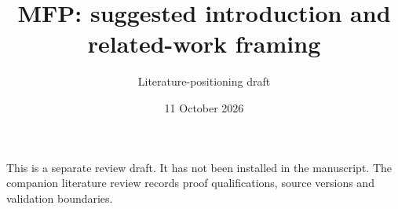 \documentclass[11pt]{article}
\title{MFP: suggested introduction and related-work framing}
\author{Literature-positioning draft}
\date{11 October 2026}
\begin{document}
\maketitle
\noindent This is a separate review draft. It has not been installed in the
manuscript. The companion literature review records proof qualifications,
source versions and validation boundaries.




\end{document}
